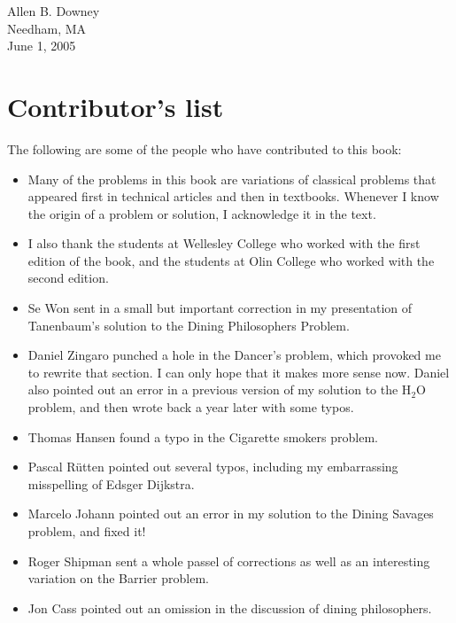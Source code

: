 \documentclass{book}
\begin{document}
\noindent Allen B. Downey \\
\noindent Needham, MA \\
\noindent June 1, 2005 \\


\section*{Contributor's list}

The following are some of the people who have contributed to this
book:

\begin{itemize}

\item Many of the problems in this book are variations of classical
problems that appeared first in technical articles and then in textbooks.
Whenever I know the origin of a problem or solution, I acknowledge it
in the text.

\item I also thank the students at Wellesley College who worked with
the first edition of the book, and the students at Olin College who
worked with the second edition.

\item Se Won sent in a small but important correction in my presentation
of Tanenbaum's solution to the Dining Philosophers Problem.

\item Daniel Zingaro punched a hole in the Dancer's problem, which
provoked me to rewrite that section.  I can only hope that it makes more
sense now.  Daniel also pointed out an error in a previous version of
my solution to the H$_2$O problem, and then wrote back a year later
with some typos.

\item Thomas Hansen found a typo in the Cigarette smokers problem.

\item Pascal R\"{u}tten pointed out several typos, including my embarrassing
misspelling of Edsger Dijkstra.

\item Marcelo Johann pointed out an error in my solution to the
Dining Savages problem, and fixed it!

\item Roger Shipman sent a whole passel of corrections as well as
an interesting variation on the Barrier problem.

\item Jon Cass pointed out an omission in the discussion of dining
philosophers.


\end{itemize}
\end{document}
